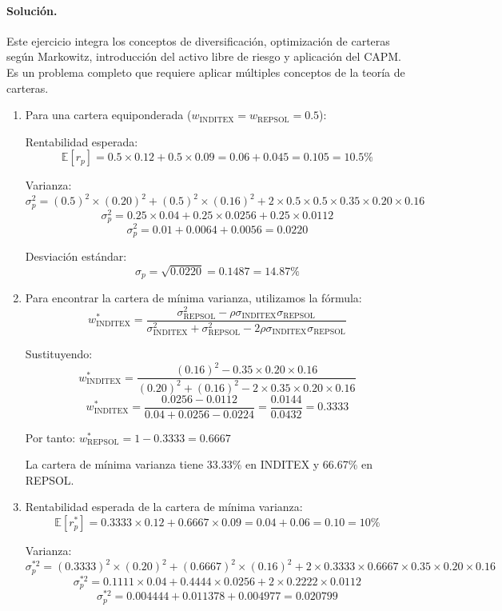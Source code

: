 \documentclass[12pt,a4paper]{article}
\newcommand{\E}{\mathbb{E}}
\newenvironment{solucion}{\paragraph{Solución.}}{}
\begin{document}
\begin{solucion}
Este ejercicio integra los conceptos de diversificación, optimización de carteras según Markowitz, introducción del activo libre de riesgo y aplicación del CAPM. Es un problema completo que requiere aplicar múltiples conceptos de la teoría de carteras.

\begin{enumerate}[label=\alph*)]
  \item Para una cartera equiponderada ($w_{\text{INDITEX}} = w_{\text{REPSOL}} = 0.5$):
  
  Rentabilidad esperada:
  \[
  \E[r_p] = 0.5 \times 0.12 + 0.5 \times 0.09 = 0.06 + 0.045 = 0.105 = 10.5\%
  \]
  
  Varianza:
  \[
  \sigma_p^2 = (0.5)^2 \times (0.20)^2 + (0.5)^2 \times (0.16)^2 + 2 \times 0.5 \times 0.5 \times 0.35 \times 0.20 \times 0.16
  \]
  \[
  \sigma_p^2 = 0.25 \times 0.04 + 0.25 \times 0.0256 + 0.25 \times 0.0112
  \]
  \[
  \sigma_p^2 = 0.01 + 0.0064 + 0.0056 = 0.0220
  \]
  
  Desviación estándar:
  \[
  \sigma_p = \sqrt{0.0220} = 0.1487 = 14.87\%
  \]

  \item Para encontrar la cartera de mínima varianza, utilizamos la fórmula:
  \[
  w_{\text{INDITEX}}^* = \frac{\sigma_{\text{REPSOL}}^2 - \rho \sigma_{\text{INDITEX}} \sigma_{\text{REPSOL}}}{\sigma_{\text{INDITEX}}^2 + \sigma_{\text{REPSOL}}^2 - 2\rho \sigma_{\text{INDITEX}} \sigma_{\text{REPSOL}}}
  \]
  
  Sustituyendo:
  \[
  w_{\text{INDITEX}}^* = \frac{(0.16)^2 - 0.35 \times 0.20 \times 0.16}{(0.20)^2 + (0.16)^2 - 2 \times 0.35 \times 0.20 \times 0.16}
  \]
  \[
  w_{\text{INDITEX}}^* = \frac{0.0256 - 0.0112}{0.04 + 0.0256 - 0.0224} = \frac{0.0144}{0.0432} = 0.3333
  \]
  
  Por tanto: $w_{\text{REPSOL}}^* = 1 - 0.3333 = 0.6667$
  
  La cartera de mínima varianza tiene 33.33\% en INDITEX y 66.67\% en REPSOL.

  \item Rentabilidad esperada de la cartera de mínima varianza:
  \[
  \E[r_p^*] = 0.3333 \times 0.12 + 0.6667 \times 0.09 = 0.04 + 0.06 = 0.10 = 10\%
  \]
  
  Varianza:
  \[
  \sigma_p^{*2} = (0.3333)^2 \times (0.20)^2 + (0.6667)^2 \times (0.16)^2 + 2 \times 0.3333 \times 0.6667 \times 0.35 \times 0.20 \times 0.16
  \]
  \[
  \sigma_p^{*2} = 0.1111 \times 0.04 + 0.4444 \times 0.0256 + 2 \times 0.2222 \times 0.0112
  \]
  \[
  \sigma_p^{*2} = 0.004444 + 0.011378 + 0.004977 = 0.020799
  \]
  

\end{enumerate}
\end{solucion}
\end{document}
